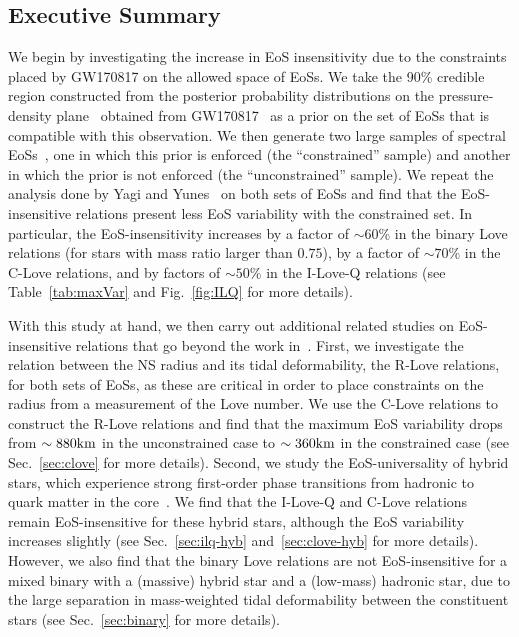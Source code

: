 \documentclass[prd,twocolumn,nofootinbib,superscriptaddress,amsmath,amssymb]{revtex4-1}
\begin{document}

\subsection{Executive Summary}

We begin by investigating the increase in EoS insensitivity due to the constraints placed by GW170817 on the allowed space of EoSs. We take the 90\% credible region constructed from the posterior probability distributions on the pressure-density plane~\cite{Carney:2018sdv,LIGO:posterior} obtained from GW170817~\cite{TheLIGOScientific:2017qsa} as a prior on the set of EoSs that is compatible with this observation. We then generate two large samples of spectral EoSs~\cite{Lindblom:2018rfr}, one in which this prior is enforced (the ``constrained'' sample) and another in which the prior is not enforced (the ``unconstrained'' sample). We repeat the analysis done by Yagi and Yunes~\cite{Yagi:binLove,Yagi:ILQ} on both sets of EoSs and find that the EoS-insensitive relations present less EoS variability with the constrained set. In particular, the EoS-insensitivity increases by a factor of $\sim 60$\% in the binary Love relations (for stars with mass ratio larger than $0.75$), by a factor of $\sim 70\%$ in the C-Love relations, and by factors of $\sim 50$\% in the I-Love-Q relations (see Table~\ref{tab:maxVar} and Fig.~\ref{fig:ILQ} for more details). 

With this study at hand, we then carry out additional related studies on EoS-insensitive relations that go beyond the work in~\cite{Yagi:binLove,Yagi:ILQ}. First, we investigate the relation between the NS radius and its tidal deformability, the R-Love relations, for both sets of EoSs, as these are critical in order to place constraints on the radius from a measurement of the Love number.  We use the C-Love relations to construct the R-Love relations and find that the maximum EoS variability drops from $\sim 880 {\rm{km}}$ in the unconstrained case to $\sim 360 {\rm{km}}$ in the constrained case (see Sec.~\ref{sec:clove} for more details). Second, we study the EoS-universality of hybrid stars, which experience strong first-order phase transitions from hadronic to quark matter in the core~\cite{Paschalidis2018,Most:2018eaw,Burgio:2018yix,Montana:2018bkb}. We find that the I-Love-Q and C-Love relations remain EoS-insensitive for these hybrid stars, although the EoS variability increases slightly (see Sec.~\ref{sec:ilq-hyb} and~\ref{sec:clove-hyb} for more details). However, we also find that the binary Love relations are not EoS-insensitive for a mixed binary with a (massive) hybrid star and a (low-mass) hadronic star, due to the large separation in mass-weighted tidal deformability between the constituent stars (see Sec.~\ref{sec:binary} for more details).
\end{document}
